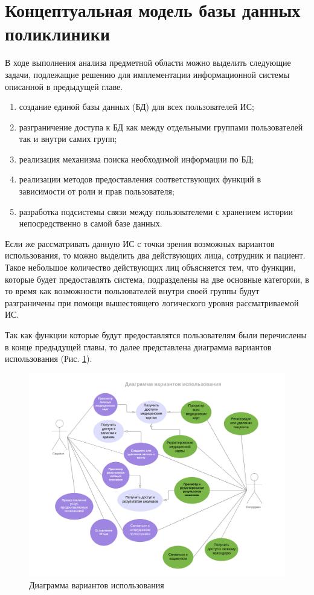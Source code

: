 \documentclass[14pt,a4paper,russian]{extreport}
\begin{document}
\section{Концептуальная модель базы данных поликлиники}
В ходе выполнения анализа предметной области можно выделить следующие задачи, подлежащие решению
для имплементации информационной системы описанной в предыдущей главе.
\begin{enumerate}[noitemsep]
    \item создание единой базы данных (БД) для всех пользователей ИС;
    \item разграничение доступа к БД как между отдельными группами пользователей так и внутри самих групп;
    \item реализация механизма поиска необходимой информации по БД;
    \item реализации методов предоставления соответствующих функций в зависимости от роли и прав
        пользователя;
    \item разработка подсистемы связи между пользователеми с хранением истории непосредственно в
        самой базе данных.
\end{enumerate}
Если же рассматривать данную ИС с точки зрения возможных вариантов использования, то можно выделить
два действующих лица, сотрудник и пациент. Такое небольшое количество действующих лиц объясняется
тем, что функции, которые будет предоставлять система, подразделены на две основные категории, в то
время как возможности пользователей внутри своей группы будут разграничены при помощи вышестоящего
логического уровня рассматриваемой ИС.

Так как функции которые будут предоставлятся пользователям были перечислены в конце предыдущей
главы, то далее представлена диаграмма вариантов использования (Рис. \ref{fig:ClinicDB}).

\begin{figure}[h]
        \includegraphics[width=\textwidth]{ClinicDB}
        \caption{Диаграмма вариантов использования}
        \label{fig:ClinicDB}
\end{figure}
\end{document}
